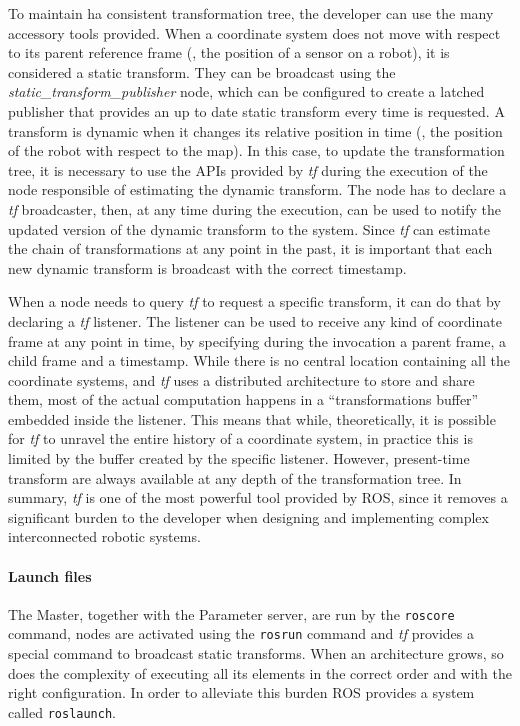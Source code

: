 To maintain ha consistent transformation tree, the developer can use the many accessory tools provided. When a coordinate system does not move with respect to its parent reference frame (\eg, the position of a sensor on a robot), it is considered a static transform. They can be broadcast using the \textit{static\_transform\_publisher} node, which can be configured to create a latched publisher that provides an up to date static transform every time is requested. A transform is dynamic when it changes its relative position in time (\eg, the position of the robot with respect to the map). In this case, to update the transformation tree, it is necessary to use the APIs provided by \textit{tf} during the execution of the node responsible of estimating the dynamic transform. The node has to declare a \textit{tf} broadcaster, then, at any time during the execution, can be used to notify the updated version of the dynamic transform to the system.  Since \textit{tf} can estimate the chain of transformations at any point in the past, it is important that each new dynamic transform is broadcast with the correct timestamp.

When a node needs to query \textit{tf} to request a specific transform, it can do that by declaring a \textit{tf} listener. The listener can be used to receive any kind of coordinate frame at any point in time, by specifying during the invocation a parent frame, a child frame and a timestamp. While there is no central location containing all the coordinate systems, and \textit{tf} uses a distributed architecture to store and share them, most of the actual computation happens in a ``transformations buffer'' embedded inside the listener. This means that while, theoretically, it is possible for \textit{tf} to unravel the entire history of a coordinate system, in practice this is limited by the buffer created by the specific listener. However, present-time transform are always available at any depth of the transformation tree. In summary, \textit{tf} is one of the most powerful tool provided by ROS, since it removes a significant burden to the developer when designing and implementing complex interconnected robotic systems.

\paragraph{Launch files} The Master, together with the Parameter server, are run by the \texttt{roscore} command, nodes are activated using the \texttt{rosrun} command and \textit{tf} provides a special command to broadcast static transforms. When an architecture grows, so does the complexity of executing all its elements in the correct order and with the right configuration. In order to alleviate this burden ROS provides a system called \texttt{roslaunch}.

